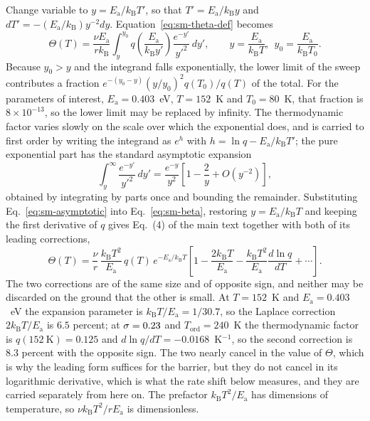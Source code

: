\documentclass[reprint,twocolumn,prb,amsmath,amssymb,superscriptaddress,floatfix]{revtex4-2}
\newcommand{\kB}{k_{\mathrm{B}}}
\newcommand{\Ea}{E_{\mathrm{a}}}
\newcommand{\Tcol}{T_{\mathrm{ord}}}
\begin{document}
Change variable to $y=\Ea/\kB T'$, so that $T'=\Ea/\kB y$ and $dT'=-(\Ea/\kB)y^{-2}dy$.
Equation~\eqref{eq:sm-theta-def} becomes
\begin{equation}
  \Theta(T) = \frac{\nu\Ea}{r\kB}\int_{y}^{y_{0}}
  q\!\left(\frac{\Ea}{\kB y'}\right)\frac{e^{-y'}}{y'^{2}}\,dy',
  \qquad
  y=\frac{\Ea}{\kB T},\ \ y_{0}=\frac{\Ea}{\kB T_{0}}.
  \label{eq:sm-beta}
\end{equation}
Because $y_{0}>y$ and the integrand falls exponentially, the lower limit of the sweep
contributes a fraction $e^{-(y_{0}-y)}(y/y_{0})^{2}q(T_{0})/q(T)$ of the total. For the
parameters of interest, $\Ea=0.403$~eV, $T=152$~K and $T_{0}=80$~K, that fraction is
$8\times10^{-13}$, so the lower limit may be replaced by infinity. The thermodynamic factor
varies slowly on the scale over which the exponential does, and is carried to first order by
writing the integrand as $e^{h}$ with $h=\ln q-\Ea/\kB T'$; the pure exponential part has the
standard asymptotic expansion
\begin{equation}
  \int_{y}^{\infty}\frac{e^{-y'}}{y'^{2}}\,dy'
  = \frac{e^{-y}}{y^{2}}\left[1-\frac{2}{y}+O(y^{-2})\right],
  \label{eq:sm-asymptotic}
\end{equation}
obtained by integrating by parts once and bounding the remainder. Substituting
Eq.~\eqref{eq:sm-asymptotic} into Eq.~\eqref{eq:sm-beta}, restoring $y=\Ea/\kB T$ and keeping
the first derivative of $q$ gives Eq.~(4) of the main text together with both of its leading
corrections,
\begin{equation}
  \Theta(T) = \frac{\nu}{r}\,\frac{\kB T^{2}}{\Ea}\,q(T)\,e^{-\Ea/\kB T}
  \left[1-\frac{2\kB T}{\Ea}-\frac{\kB T^{2}}{\Ea}\frac{d\ln q}{dT}+\cdots\right].
  \label{eq:sm-theta}
\end{equation}
The two corrections are of the same size and of opposite sign, and neither may be discarded on
the ground that the other is small. At
$T=152$~K and $\Ea=0.403$~eV the expansion parameter is $\kB T/\Ea=1/30.7$, so the Laplace
correction $2\kB T/\Ea$ is $6.5$ percent; at $\sigma=0.23$ and $\Tcol=240$~K the
thermodynamic factor is $q(152\ \mathrm{K})=0.125$ and $d\ln q/dT=-0.0168$~K$^{-1}$, so the
second correction is $8.3$ percent with the opposite sign. The two nearly cancel in the value
of $\Theta$, which is why the leading form suffices for the barrier, but they do not cancel in
its logarithmic derivative, which is what the rate shift below
measures, and they are carried separately from here on. The prefactor
$\kB T^{2}/\Ea$ has dimensions of temperature, so $\nu\kB T^{2}/r\Ea$ is dimensionless.
\end{document}
